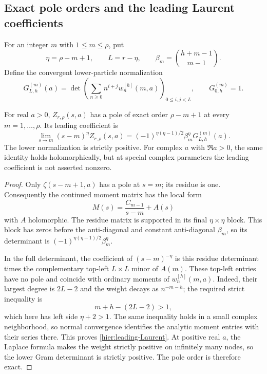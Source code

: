 \subsection{Exact pole orders and the leading Laurent coefficients}

For an integer $m$ with $1\le m\le\rho$, put
\begin{equation}\label{hier:pole-parameters}
 \eta=\rho-m+1,\qquad L=r-\eta,
 \qquad \beta_m=\binom{h+m-1}{m-1}.
\end{equation}
Define the convergent lower-particle normalization
\begin{equation}\label{hier:lower-normalization}
 G_{L,h}^{(m)}(a)=
 \det\left(\sum_{n\ge0}n^{i+j}w_n^{[h]}(m,a)\right)_{0\le i,j<L},
 \qquad G_{0,h}^{(m)}=1.
\end{equation}

\begin{theorem}
\label{hier:poles}
For real $a>0$, $Z_{r,\rho}(s,a)$ has a pole of exact order
$\rho-m+1$ at every $m=1,\ldots,\rho$.  Its leading coefficient is
\begin{equation}\label{hier:leading-Laurent}
 \boxed{\displaystyle
 \lim_{s\to m}(s-m)^{\eta}Z_{r,\rho}(s,a)
 =(-1)^{\eta(\eta-1)/2}\beta_m^{\eta}G_{L,h}^{(m)}(a).}
\end{equation}
The lower normalization is strictly positive.  For complex $a$ with
$\Re a>0$, the same identity holds holomorphically, but at special
complex parameters the leading coefficient is not asserted nonzero.
\end{theorem}
\begin{proof}
Only $\zeta(s-m+1,a)$ has a pole at $s=m$; its residue is one.
Consequently the continued moment matrix has the local form
\[
 M(s)=\frac{C_{m-1}}{s-m}+A(s)
\]
with $A$ holomorphic.  The residue matrix is supported in its final
$\eta\times\eta$ block.  This block has zeros before the
anti-diagonal and constant anti-diagonal $\beta_m$, so its
determinant is
$(-1)^{\eta(\eta-1)/2}\beta_m^{\eta}$.

In the full determinant, the coefficient of $(s-m)^{-\eta}$ is this
residue determinant times the complementary top-left $L\times L$
minor of $A(m)$.  These top-left entries have no pole and coincide
with ordinary moments of $w_n^{[h]}(m,a)$.  Indeed, their largest
degree is $2L-2$ and the weight decays as $n^{-m-h}$; the required
strict inequality is
\[
 m+h-(2L-2)>1,
\]
which here has left side $\eta+2>1$.  The same inequality holds in
a small complex neighborhood, so normal convergence identifies the
analytic moment entries with their series there.  This proves
\eqref{hier:leading-Laurent}.  At positive real $a$, the Laplace
formula makes the weight strictly positive on infinitely many nodes,
so the lower Gram determinant is strictly positive.  The pole order
is therefore exact.
\end{proof}

